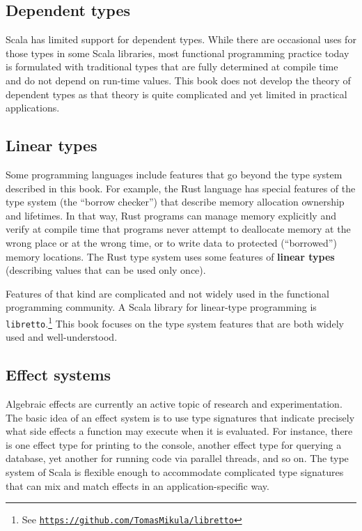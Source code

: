 \subsection{Dependent types}

Scala has limited support for dependent types.
While there are occasional uses for those types in some Scala libraries,
most functional programming practice today is formulated with traditional
types that are fully determined at compile time and do not depend
on run-time values. This book does not develop the theory of dependent
types as that theory is quite complicated and yet limited in practical
applications.

\subsection{Linear types}

Some programming languages include features that go beyond the type
system described in this book. For example, the Rust language has
special features of the type system (the \textsf{``}borrow checker\textsf{''}) that
describe memory allocation ownership and lifetimes. In that way, Rust
programs can manage memory explicitly and verify at compile time that
programs never attempt to deallocate memory at the wrong place or
at the wrong time, or to write data to protected (\textsf{``}borrowed\textsf{''})
memory locations. The Rust type system uses some features of \textbf{linear
types} (describing values
that can be used only once).

Features of that kind are complicated and not widely used in the functional
programming community. A Scala library for linear-type programming
is \lstinline!libretto!.\footnote{See \texttt{\href{https://github.com/TomasMikula/libretto}{https://github.com/TomasMikula/libretto}}}
This book focuses on the type system features that are both widely
used and well-understood.

\subsection{Effect systems}

Algebraic effects are currently an active topic of research and experimentation.
The basic idea of an effect system is to use type signatures that
indicate precisely what side effects a function may execute when it
is evaluated. For instance, there is one effect type for printing
to the console, another effect type for querying a database, yet another
for running code via parallel threads, and so on. The type system
of Scala is flexible enough to accommodate complicated type signatures
that can mix and match effects in an application-specific way.

